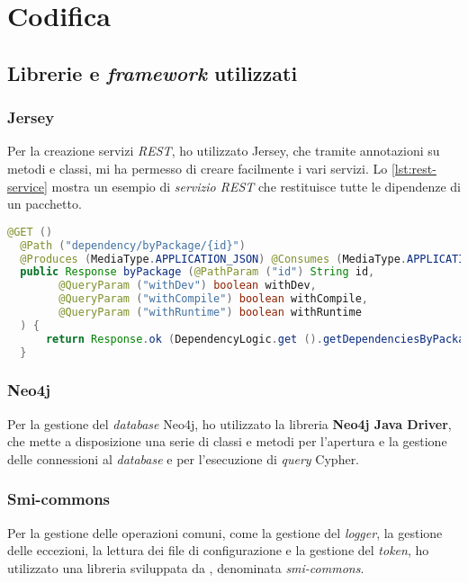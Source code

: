 
\section*{Codifica}
\subsection*{Librerie e \textit{framework} utilizzati}
\subsubsection*{Jersey}
Per la creazione servizi \textit{REST}, ho utilizzato Jersey, che tramite annotazioni su metodi e classi, 
mi ha permesso di creare facilmente i vari servizi.
Lo \snippet{}  \ref*{lst:rest-service} mostra un esempio di \textit{servizio REST} che restituisce tutte le dipendenze di un pacchetto.\\
\begin{lstlisting}[language=Java, caption={Esempio di \textit{servizio REST} utilizzando Jersey.},captionpos=b, label={lst:rest-service}]
  @GET ()
  @Path ("dependency/byPackage/{id}")
  @Produces (MediaType.APPLICATION_JSON) @Consumes (MediaType.APPLICATION_JSON)
  public Response byPackage (@PathParam ("id") String id, 
        @QueryParam ("withDev") boolean withDev, 
        @QueryParam ("withCompile") boolean withCompile, 
        @QueryParam ("withRuntime") boolean withRuntime
  ) {
      return Response.ok (DependencyLogic.get ().getDependenciesByPackage (id, withDev, withCompile, withRuntime)).build ();
  }
\end{lstlisting}

\subsubsection*{Neo4j}
Per la gestione del \textit{database} Neo4j, ho utilizzato la libreria \textbf{Neo4j Java Driver}, 
che mette a disposizione una serie di classi e metodi per l'apertura e la gestione delle connessioni al \textit{database} e 
per l'esecuzione di \textit{query} Cypher.\\

\subsubsection*{Smi-commons}
Per la gestione delle operazioni comuni, come la gestione del \textit{logger}, la gestione delle eccezioni, la lettura dei 
file di configurazione e la gestione del \textit{token}, ho utilizzato una libreria sviluppata da \azienda{}, denominata \textit{smi-commons}.\\

